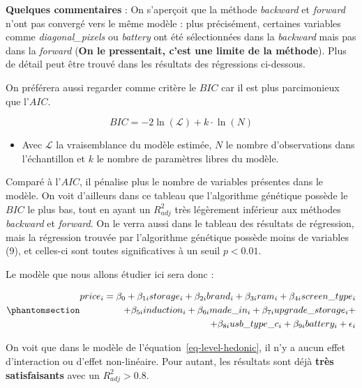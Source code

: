 \documentclass[
  12pt,
]{report}
\providecommand{\tightlist}{%
  \setlength{\itemsep}{0pt}\setlength{\parskip}{0pt}}\usepackage{longtable,booktabs,array}
\begin{document}
\textbf{Quelques commentaires} : On s'aperçoit que la méthode
\emph{backward} et \emph{forward} n'ont pas convergé vers le même modèle
: plus précisément, certaines variables comme \emph{diagonal\_pixels} ou
\emph{battery} ont été sélectionnées dans la \emph{backward} mais pas
dans la \emph{forward} (\textbf{On le pressentait, c'est une limite de
la méthode}). Plus de détail peut être trouvé dans les résultats des
régressions ci-dessous.

On préférera aussi regarder comme critère le \(BIC\) car il est plus
parcimonieux que l'\(AIC\).

\[ BIC = -2\ln(\mathcal{L}) + k \cdot \ln(N) \]

\begin{itemize}
\tightlist
\item
  Avec \(\mathcal{L}\) la vraisemblance du modèle estimée, \(N\) le
  nombre d'observations dans l'échantillon et \(k\) le nombre de
  paramètres libres du modèle.
\end{itemize}

Comparé à l'\(AIC\), il pénalise plus le nombre de variables présentes
dans le modèle. On voit d'ailleurs dans ce tableau que l'algorithme
génétique possède le \(BIC\) le plus bas, tout en ayant un \(R^2_{adj}\)
très légèrement inférieur aux méthodes \emph{backward} et
\emph{forward}. On le verra aussi dans le tableau des résultats de
régression, mais la régression trouvée par l'algorithme génétique
possède moins de variables (9), et celles-ci sont toutes significatives
à un seuil \(p<0.01\).

Le modèle que nous allons étudier ici sera donc :

\begin{equation}\phantomsection\label{eq-level-hedonic}{
\begin{split}
price_i = \beta_0 + \beta_{1i} storage_i + \beta_{2i}brand_i + \beta_{3i}ram_i + \beta_{4i}screen\_type_i \\
+ \beta_{5i}induction_i + \beta_{6i}made\_in_i + \beta_{7i}upgrade\_storage_i + \\ 
+ \beta_{8i}usb\_type\_c_i  + \beta_{9i}battery_i + \epsilon_i
\end{split}
}\end{equation}

On voit que dans le modèle de l'équation~\ref{eq-level-hedonic}, il n'y
a aucun effet d'interaction ou d'effet non-linéaire. Pour autant, les
résultats sont déjà \textbf{très satisfaisants} avec un
\(R^2_{adj} > 0.8\).
\end{document}
